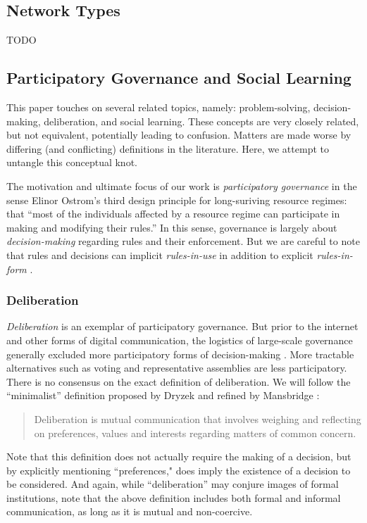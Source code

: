 \documentclass[manuscript,screen,review,acmsmall]{acmart}
\begin{document}
\subsection{Network Types}

TODO

\subsection{Participatory Governance and Social Learning}
This paper touches on several related topics, namely: problem-solving, decision-making, deliberation, and social learning.
These concepts are very closely related, but not equivalent,
potentially leading to confusion.
Matters are made worse by differing (and conflicting) definitions in the literature.
Here, we attempt to untangle this conceptual knot.

The motivation and ultimate focus of our work is {\em participatory governance}
in the sense Elinor Ostrom's third design principle for long-suriving resource regimes: that ``most of the individuals affected by a resource
regime can participate in making and modifying their rules.''
\cite{ostrom_collective_2000}
In this sense, governance is largely about {\em decision-making} regarding
rules and their enforcement.
But we are careful to note that rules and decisions can implicit
{\em rules-in-use} in addition to explicit {\em rules-in-form}
\cite{hess_framework_2005, keegan_evolution_2017}.

\subsubsection{Deliberation}
{\em Deliberation} is an exemplar of participatory governance.
But prior to the internet and other forms of digital communication,
the logistics of large-scale governance generally excluded more participatory
forms of decision-making \cite{ackerman_deliberation_2002}.
More tractable alternatives such as voting and representative
assemblies are less participatory.
There is no consensus on the exact definition of deliberation.
We will follow the ``minimalist'' definition proposed by Dryzek
\cite{dryzek_deliberative_2002} and refined by Mansbridge \cite{mansbridge_minimalist_2015}:
\begin{quote}
Deliberation is mutual communication that involves weighing and reflecting on preferences, values and interests regarding matters of common concern.
\end{quote}
Note that this definition does not actually require the making of a decision, but by explicitly mentioning ``preferences," does imply the existence of a decision to be considered.
And again, while ``deliberation'' may conjure images of formal institutions,
note that the above definition includes both formal and informal communication,
as long as it is mutual and non-coercive.
\end{document}
